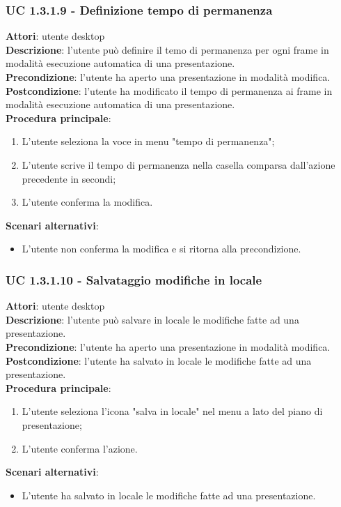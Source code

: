 \subsubsection{UC 1.3.1.9 - Definizione tempo di permanenza}{
	\label{uc1.3.1.9}
	\textbf{Attori}: utente desktop \\
	\textbf{Descrizione}: l'utente può definire il temo di permanenza per ogni frame in modalità esecuzione automatica di una presentazione. \\
	\textbf{Precondizione}: l'utente ha aperto una presentazione in modalità modifica.	\\
	\textbf{Postcondizione}: l'utente ha modificato il tempo di permanenza ai frame in modalità esecuzione automatica di una presentazione.	\\
	\textbf{Procedura principale}:
	\begin{enumerate}
		\item L'utente seleziona la voce in menu "tempo di permanenza";
		\item L'utente scrive il tempo di permanenza nella casella comparsa dall'azione precedente in secondi;
		\item L'utente conferma la modifica.
	\end{enumerate}
	\textbf{Scenari alternativi}:
	\begin{itemize}
		\item L'utente non conferma la modifica  e si ritorna alla precondizione.
	\end{itemize}
}
\subsubsection{UC 1.3.1.10 - Salvataggio modifiche in locale}{
	\label{uc1.3.1.10}
	\textbf{Attori}: utente desktop \\
	\textbf{Descrizione}: l'utente può salvare in locale le modifiche fatte ad una presentazione. \\
	\textbf{Precondizione}: l'utente ha aperto una presentazione in modalità modifica.	\\
	\textbf{Postcondizione}: l'utente ha salvato in locale le modifiche fatte ad una presentazione.	\\
	\textbf{Procedura principale}:
	\begin{enumerate}
		\item L'utente seleziona l'icona "salva in locale" nel menu a lato del piano di presentazione;
		\item L'utente conferma l'azione.
	\end{enumerate}
	\textbf{Scenari alternativi}:
	\begin{itemize}
		\item L'utente ha salvato in locale le modifiche fatte ad una presentazione.
	\end{itemize}
}
